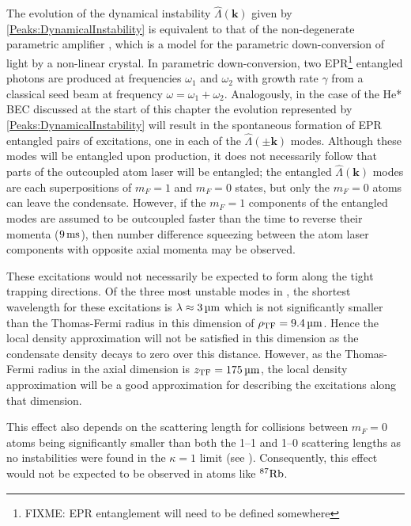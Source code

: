 The evolution of the dynamical instability $\hat{\Lambda}(\bm{k})$ given by \eqref{Peaks:DynamicalInstability} is equivalent to that of the non-degenerate parametric amplifier \citep{WallsMilburn}, which is a model for the parametric down-conversion of light by a non-linear crystal. In parametric down-conversion, two EPR\footnote{FIXME: EPR entanglement will need to be defined somewhere} entangled photons are produced at frequencies $\omega_1$ and $\omega_2$ with growth rate $\gamma$ from a classical seed beam at frequency $\omega = \omega_1 + \omega_2$. Analogously, in the case of the He* BEC discussed at the start of this chapter the evolution represented by \eqref{Peaks:DynamicalInstability} will result in the spontaneous formation of EPR entangled pairs of excitations, one in each of the $\hat{\Lambda}(\pm \bm{k})$ modes. Although these modes will be entangled upon production, it does not necessarily follow that parts of the outcoupled atom laser will be entangled; the entangled $\hat{\Lambda}(\bm{k})$ modes are each superpositions of $m_F=1$ and $m_F=0$ states, but only the $m_F=0$ atoms can leave the condensate. However, if the $m_F=1$ components of the entangled modes are assumed to be outcoupled faster than the time to reverse their momenta ($\unit[9]{ms}$), then number difference squeezing between the atom laser components with opposite axial momenta may be observed.

These excitations would not necessarily be expected to form along the tight trapping directions. Of the three most unstable modes in , the shortest wavelength for these excitations is $\lambda \approx \unit[3]{\micro m}$ which is not significantly smaller than the Thomas-Fermi radius in this dimension of $\rho_\text{TF} = \unit[9.4]{\micro m}$. Hence the local density approximation will not be satisfied in this dimension as the condensate density decays to zero over this distance. However, as the Thomas-Fermi radius in the axial dimension is $z_\text{TF} = \unit[175]{\micro m}$, the local density approximation will be a good approximation for describing the excitations along that dimension.

This effect also depends on the scattering length for collisions between $m_F=0$ atoms being significantly smaller than both the 1--1 and 1--0 scattering lengths as no instabilities were found in the $\kappa = 1$ limit (see ). 
Consequently, this effect would not be expected to be observed in atoms like $\nucl{87}{}{Rb}$.


